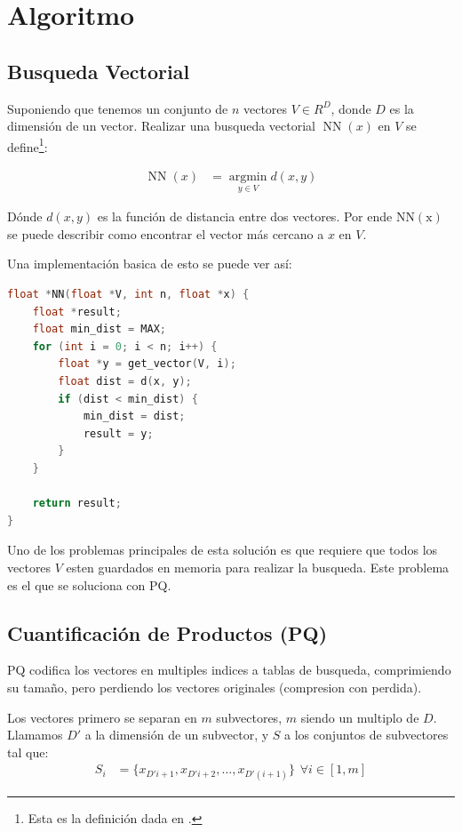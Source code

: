 \section{Algoritmo}

\subsection{Busqueda Vectorial}

Suponiendo que tenemos un conjunto de \(n\) vectores \(V \in R^D\), donde \(D\) 
es la dimensi\'on de un vector. Realizar una busqueda vectorial 
\(\operatorname{NN}(x)\) en \(V\) se define\footnote{
    Esta es la definici\'on dada en \cite{pqnns}.}: 

\begin{align}
    \operatorname*{NN}(x) &= \operatorname*{argmin}_{y \in V} d(x, y)
\end{align}

D\'onde \(d(x,y)\) es la funci\'on de distancia entre dos vectores.
Por ende \(\operatorname{NN(x)}\) se puede describir como encontrar el vector 
m\'as cercano a \(x\) en \(V\). 

Una implementaci\'on basica de esto se puede ver as\'i: 

\begin{lstlisting}[language=C, caption=Algoritmo sin PQ]
float *NN(float *V, int n, float *x) {
    float *result;
    float min_dist = MAX;
    for (int i = 0; i < n; i++) {
        float *y = get_vector(V, i);
        float dist = d(x, y);
        if (dist < min_dist) {
            min_dist = dist; 
            result = y;
        }
    }

    return result;
}
\end{lstlisting}

Uno de los problemas principales de esta soluci\'on es que requiere que todos 
los vectores \(V\) esten guardados en memoria para realizar la busqueda. 
Este problema es el que se soluciona con PQ.

\newpage
\subsection{Cuantificaci\'on de Productos (PQ)}

PQ codifica los vectores en multiples indices a tablas de busqueda, 
comprimiendo su tama\~no, pero perdiendo los vectores originales (compresion 
con perdida). 

Los vectores primero se separan en \(m\) subvectores, \(m\) siendo un multiplo
de \(D\). Llamamos \(D'\) a la dimensi\'on de un subvector, y \(S\) a los
conjuntos de subvectores tal que:
\begin{align}
  S_i &= \{ x_{D'i+1}, x_{D'i+2}, \dots, x_{D'(i+1)} \} 
  \hspace{5pt} 
  \forall i \in [1,m]
\end{align}

